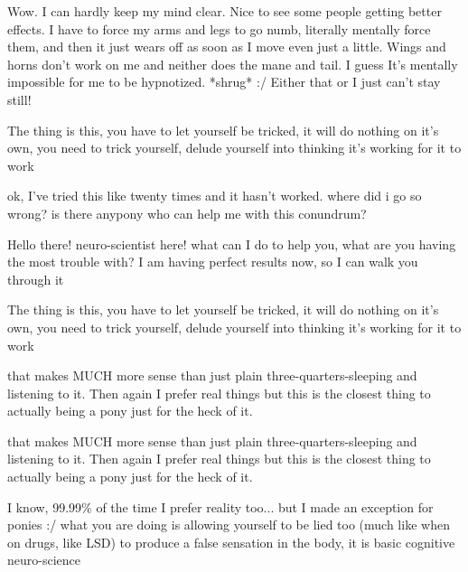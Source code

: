 \documentclass[ebook,12pt,oneside,openany]{memoir}
\newcommand{\mytexttilde}{\raisebox{0.5ex}{\texttildelow}}
\begin{document}
\begin{tcolorbox}[title=\mytexttilde{}Lawful Sturdy Wing\mytexttilde{},colback=magenta!5!white,colframe=magenta!75!black,coltitle=white]
\begin{tcolorbox}[title=Scarletthealicorn]
\par{Wow. I can hardly keep my mind clear. Nice to see some people getting better effects. I have to force my arms and legs to go numb, literally mentally force them, and then it just wears off as soon as I move even just a little. Wings and horns don't work on me and neither does the mane and tail. I guess It's mentally impossible for me to be hypnotized. *shrug* :/ Either that or I just can't stay still!}
\end{tcolorbox}
\par{The thing is this, you have to let yourself be tricked, it will do nothing on it's own, you need to trick yourself, delude yourself into thinking it's working for it to work}
\newline{}
\begin{tcolorbox}[title=Toby]
\par{ok, I've tried this like twenty times and it hasn't worked. where did i go so wrong? is there anypony who can help me with this conundrum?}
\end{tcolorbox}
\par{Hello there! neuro-scientist here! what can I do to help you, what are you having the most trouble with? I am having perfect results now, so I can walk you through it}
\end{tcolorbox}
\begin{tcolorbox}[title=Scarletthealicorn,colback=lime!5!white,colframe=lime!75!black,coltitle=white]
\begin{tcolorbox}[title=\mytexttilde{}Lawful Sturdy Wing\mytexttilde{}]
\par{The thing is this, you have to let yourself be tricked, it will do nothing on it's own, you need to trick yourself, delude yourself into thinking it's working for it to work}
\end{tcolorbox}
that makes MUCH more sense than just plain three-quarters-sleeping and listening to it. Then again I prefer real things but this is the closest thing to actually being a pony just for the heck of it.\end{tcolorbox}
\begin{tcolorbox}[title=\mytexttilde{}Lawful Sturdy Wing\mytexttilde{},colback=magenta!5!white,colframe=magenta!75!black,coltitle=white]
\begin{tcolorbox}[title=Scarletthealicorn]
\par{that makes MUCH more sense than just plain three-quarters-sleeping and listening to it. Then again I prefer real things but this is the closest thing to actually being a pony just for the heck of it.}
\end{tcolorbox}
\par{I know, 99.99\% of the time I prefer reality too... but I made an exception for ponies :/ what you are doing is allowing yourself to be lied too (much like when on drugs, like LSD) to produce a false sensation in the body, it is basic cognitive neuro-science }
\end{tcolorbox}
\end{document}
